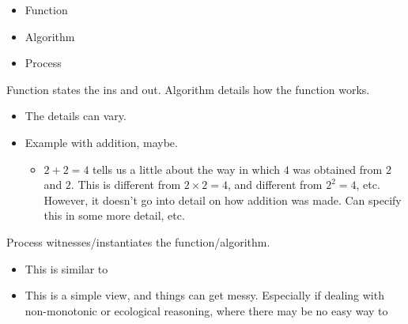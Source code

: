 \documentclass[10pt]{article}
\begin{document}
\begin{itemize}
\item Function
\item Algorithm
\item Process
\end{itemize}

Function states the ins and out.
Algorithm details how the function works.
\begin{itemize}
\item The details can vary.
\item Example with addition, maybe.
  \begin{itemize}
  \item \(2 + 2 = 4\) tells us a little about the way in which \(4\) was obtained from \(2\) and \(2\).
    This is different from \(2 \times 2 = 4\), and different from \(2^{2} = 4\), etc.
    However, it doesn't go into detail on how addition was made.
    Can specify this in some more detail, etc.\
  \end{itemize}
\end{itemize}
Process witnesses/instantiates the function/algorithm.

\begin{itemize}
\item This is similar to \textcite{Marr:1982aa}
\item This is a simple view, and things can get messy.
  Especially if dealing with non-monotonic or ecological reasoning, where there may be no easy way to 
\end{itemize}
\end{document}
